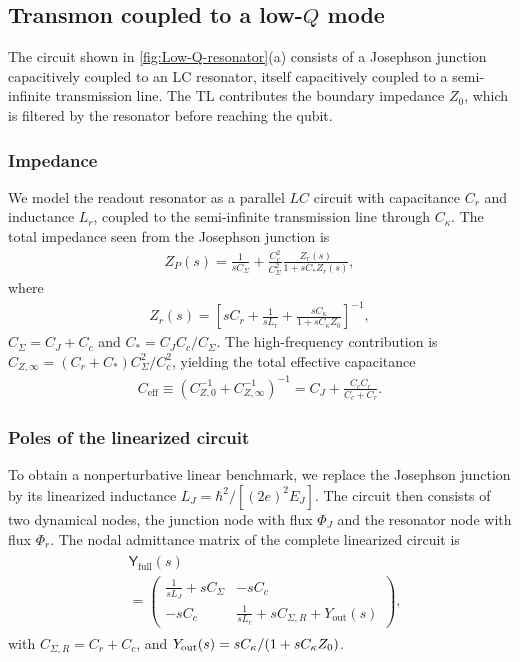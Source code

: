 \documentclass[prx,aps,twocolumn,article]{revtex4-2}
\newcommand{\msf}[1]{\mathsf{#1}}
\newcommand{\msY}{\msf{Y}}
\begin{document}
\subsection{Transmon coupled to a low-$Q$ mode}
\label{App:LowQEnvironment}
The circuit shown in \cref{fig:Low-Q-resonator}(a) consists of a Josephson junction capacitively coupled to an LC resonator, itself capacitively coupled to a semi-infinite transmission line. The \gls{TL} contributes the boundary impedance $Z_0$, which is filtered by the resonator before reaching the qubit.

\subsubsection{Impedance}

We model the readout resonator as a parallel $LC$ circuit with capacitance
$C_r$ and inductance $L_r$, coupled to the semi-infinite transmission line
through $C_\kappa$. The total impedance seen from the Josephson junction is
\begin{align}
    Z_P(s)
    =
    \frac{1}{sC_\Sigma}
    +
    \frac{C_c^2}{C_\Sigma^2}
    \frac{Z_r(s)}{1+sC_\ast Z_r(s)},
\end{align}
where
\begin{align}
    Z_r(s) =\left[      sC_r
        +
        \frac{1}{sL_r}
        +
        \frac{sC_\kappa}{1+sC_\kappa Z_0}
    \right]^{-1},
\end{align}
$C_\Sigma=C_J+C_c$ and $C_\ast=C_JC_c/C_\Sigma$. The high-frequency contribution is $C_{Z,\infty}=(C_r+C_*)C_\Sigma^2/C_c^2$, yielding the total effective capacitance 
\begin{align}
    C_{\mathrm{eff}}\equiv(C_{Z,0}^{-1}+C_{Z,\infty}^{-1})^{-1}=C_J+\frac{C_cC_r}{C_c+C_r}.
\end{align}

\subsubsection{Poles of the linearized circuit}

To obtain a nonperturbative linear benchmark, we replace the Josephson
junction by its linearized inductance $L_J
    = \hbar^2/[(2e)^2E_J]$. The circuit then consists of two dynamical nodes, the junction node with flux $\Phi_J$ and the resonator node with flux $\Phi_r$. The nodal admittance matrix of the complete linearized circuit is
\begin{align}
\begin{aligned}
    &\msY_{\mathrm{full}}(s)
    \\
    &=
    \begin{pmatrix}
        \frac{1}{sL_J}
        +sC_\Sigma
        &
        -sC_c
        \\
        -sC_c
        &
        \frac{1}{sL_r}
        +sC_{\Sigma,R}
        +Y_{\mathrm{out}}(s)
    \end{pmatrix},
    \end{aligned}
    \label{Eq:FullLinearizedAdmittance}
\end{align}
with $C_{\Sigma,R}=C_r+C_c$, and $Y_{\rm out}(s)=sC_\kappa/(1+sC_\kappa Z_0)$.
\end{document}
